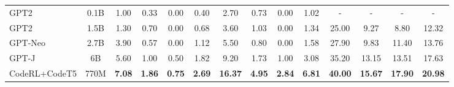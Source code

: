 \documentclass{article}
\begin{document}
\begin{table}[t]
\begin{subtable}[htbp]{1.0\textwidth}
{\begin{tabular}{lc|cccc|cccc|cccc}
GPT2                                        & 0.1B                   & 1.00          & 0.33          & 0.00          & 0.40          & 2.70           & 0.73          & 0.00          & 1.02          & -              & -              & -              & -              \\
GPT2                                        & 1.5B                   & 1.30          & 0.70          & 0.00          & 0.68          & 3.60           & 1.03          & 0.00          & 1.34          & 25.00              & 9.27              & 8.80              & 12.32              \\
GPT-Neo                                     & 2.7B                   & 3.90          & 0.57          & 0.00          & 1.12          & 5.50           & 0.80          & 0.00          & 1.58          & 27.90              & 9.83              & 11.40              & 13.76              \\
GPT-J                                       & 6B                     & 5.60          & 1.00          & 0.50          & 1.82          & 9.20           & 1.73          & 1.00          & 3.08          & 35.20              & 13.15              & 13.51              & 17.63              \\
 \hline


CodeRL+CodeT5                                 & 770M                   & \textbf{7.08}	& \textbf{1.86} & 	\textbf{0.75} &	\textbf{2.69} &	\textbf{16.37}	& \textbf{4.95}	& \textbf{2.84}	& \textbf{6.81} &	\textbf{40.00} &	\textbf{15.67}	& \textbf{17.90}	& \textbf{20.98} \\

\hline
\end{tabular}
}
\end{subtable}



\end{table}
\end{document}
